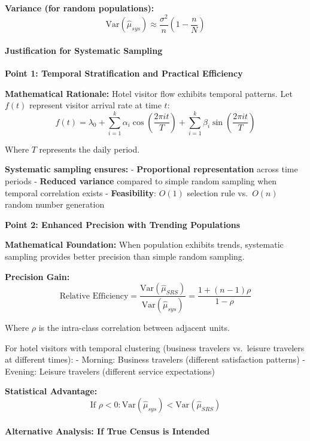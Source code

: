 \documentclass[11pt]{article}
\begin{document}
\textbf{Variance (for random populations):}
\[\text{Var}(\hat{\mu}_{sys}) \approx \frac{\sigma^2}{n}\left(1 - \frac{n}{N}\right)\]

\paragraph{Justification for Systematic
Sampling}\label{justification-for-systematic-sampling}

\textbf{Point 1: Temporal Stratification and Practical Efficiency}

\textbf{Mathematical Rationale:} Hotel visitor flow exhibits temporal
patterns. Let \(f(t)\) represent visitor arrival rate at time \(t\):
\[f(t) = \lambda_0 + \sum_{i=1}^{k} \alpha_i \cos\left(\frac{2\pi i t}{T}\right) + \sum_{i=1}^{k} \beta_i \sin\left(\frac{2\pi i t}{T}\right)\]

Where \(T\) represents the daily period.

\textbf{Systematic sampling ensures:} - \textbf{Proportional
representation} across time periods - \textbf{Reduced variance} compared
to simple random sampling when temporal correlation exists -
\textbf{Feasibility}: \(O(1)\) selection rule vs.~\(O(n)\) random number
generation

\textbf{Point 2: Enhanced Precision with Trending Populations}

\textbf{Mathematical Foundation:} When population exhibits trends,
systematic sampling provides better precision than simple random
sampling.

\textbf{Precision Gain:}
\[\text{Relative Efficiency} = \frac{\text{Var}(\hat{\mu}_{SRS})}{\text{Var}(\hat{\mu}_{sys})} = \frac{1 + (n-1)\rho}{1 - \rho}\]

Where \(\rho\) is the intra-class correlation between adjacent units.

For hotel visitors with temporal clustering (business travelers
vs.~leisure travelers at different times): - Morning: Business travelers
(different satisfaction patterns) - Evening: Leisure travelers
(different service expectations)

\textbf{Statistical Advantage:}
\[\text{If } \rho < 0: \text{Var}(\hat{\mu}_{sys}) < \text{Var}(\hat{\mu}_{SRS})\]

\paragraph{Alternative Analysis: If True Census is
Intended}\label{alternative-analysis-if-true-census-is-intended}
\end{document}
